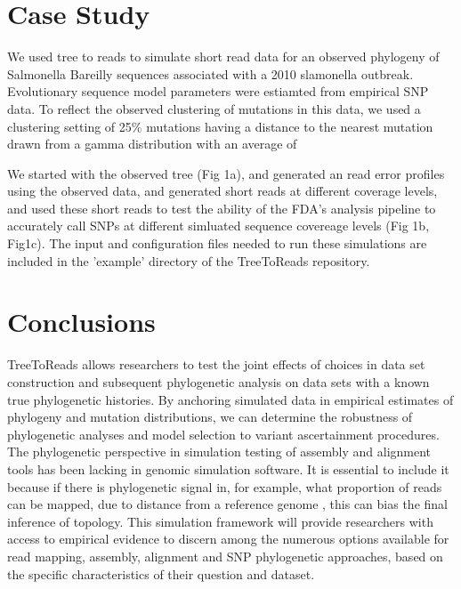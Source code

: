 \documentclass{bioinfo}
\begin{document}
\section{Case Study}
We used tree to reads to simulate short read data for an observed phylogeny of Salmonella Bareilly sequences associated with a 2010 slamonella outbreak.
Evolutionary sequence model parameters were estiamted from empirical SNP data. 
To reflect the observed clustering of mutations in this data, we used a clustering setting of 25\% mutations having a distance to the nearest mutation drawn from a gamma distribution with an average of 

We started with the observed tree (Fig 1a), and generated an read error profiles using the observed data, and generated short reads at different coverage levels,
and used these short reads to test the ability of the FDA's analysis pipeline to accurately call SNPs at different simluated sequence covereage levels (Fig 1b, Fig1c). 
The input and configuration files needed to run these simulations are included in the 'example' directory of the TreeToReads repository.


\section{Conclusions}
TreeToReads allows researchers to test the joint effects of choices in data set construction and subsequent phylogenetic analysis on data sets with a known true phylogenetic histories.
By anchoring simulated data in empirical estimates of phylogeny and mutation distributions, 
we can determine the robustness of phylogenetic analyses and model selection to variant ascertainment procedures.
The phylogenetic perspective in simulation testing of assembly and alignment tools has been lacking in genomic simulation software.
It is essential to include it because if there is phylogenetic signal in, for example, what proportion of reads can be mapped, due to distance from a reference genome \citep{bertels_automated_2014},
this can bias the final inference of topology.
This simulation framework will provide researchers with access to empirical evidence to discern among the numerous options available for read mapping, assembly, alignment and SNP phylogenetic approaches,
based on the specific characteristics of their question and dataset.


\end{document}
